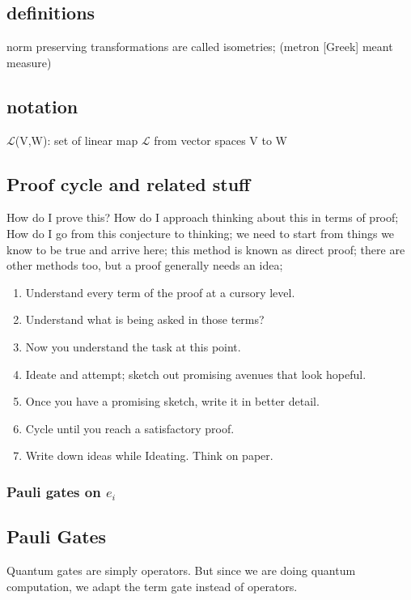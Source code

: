 \documentclass{article}
\begin{document}
\subsection{definitions}
norm preserving transformations are called isometries; (metron [Greek] meant measure)

\subsection{notation}
$\mathcal{L}$(V,W): set of linear map $\mathcal{L}$ from vector spaces V to W

\subsection*{Proof cycle and related stuff}

How do I prove this? How do I approach thinking about this in terms of proof; How do I go from this conjecture to thinking; we need to start from things we know to be true and arrive here; this method is known as direct proof; there are other methods too, but a proof generally needs an idea;
\begin{enumerate}
    \item Understand every term of the proof at a cursory level.
    \item Understand what is being asked in those terms?
    \item Now you understand the task at this point.
    \item Ideate and attempt; sketch out promising avenues that look hopeful.
    \item Once you have a promising sketch, write it in better detail.
    \item Cycle until you reach a satisfactory proof.
    \item Write down ideas while Ideating. Think on paper.
\end{enumerate}

\subsubsection{Pauli gates on $e_i$}

\subsection{Pauli Gates}
Quantum gates are simply operators. But since we are doing quantum computation, we adapt the term gate instead of operators.
\end{document}
